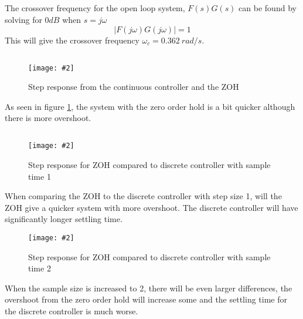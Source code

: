 \documentclass[12pt,a4paper]{article}
\newcommand{\fig}[4]{
    \begin{figure}[!h]
      \centering
      \texttt{[image: \#2]}
        \label{fig:#3}
        \caption{#4}
    \end{figure}
}
\begin{document}
  \subsection{}%
  The crossover frequency for the open loop system, $F(s)G(s)$ can be
  found by solving for $0dB$ when $s=j\omega$
  \begin{equation}
    |F(j\omega)G(j\omega)|=1
  \end{equation}
  This will give the crossover frequency $\omega_c=0.362\:rad/s$.

  \subsection{}%

  \fig{0.4}{con_zero_compare.png}{cont_zero_step}{Step response
  from the continuous controller and the ZOH}
  As seen in figure \ref{fig:cont_zero_step}, the system with the zero
  order hold is a bit quicker although there is more overshoot.

  \subsection{}%

  \fig{0.4}{zero_dis_comp_sample_1.png}{zoh_dis_comp_s1}{Step response
  for ZOH compared to discrete controller with sample time 1}
  When comparing the ZOH to the discrete controller with step size 1, will the ZOH give a
  quicker system with more overshoot. The discrete controller will have
  significantly longer settling time.\\

  \fig{0.4}{zero_dis_comp_sample_2.png}{zoh_dis_comp_s2}{Step response
  for ZOH compared to discrete controller with sample time 2}
  When the sample size is increased to 2, there will be even larger
  differences, the overshoot from the zero order hold will increase some
  and the settling time for the discrete controller is much worse.

  \subsection{}%
\end{document}
